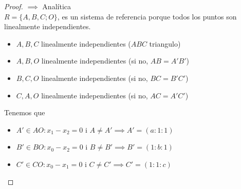 \begin{proof}
$\implies$ Analítica \\
$R = \{A,B,C;O\}$, es un sistema de referencia porque todos los puntos son linealmente independientes.
\begin{itemize}
    \item $A,B,C$ linealmente independientes ($ABC$ triangulo)
    \item $A,B,O$ linealmente independientes (si no, $AB = A'B'$)
    \item $B,C,O$ linealmente independientes (si no, $BC = B'C'$)
    \item $C,A,O$ linealmente independientes (si no, $AC = A'C'$)
\end{itemize}
Tenemos que 
\begin{itemize}
    \item $A' \in AO : x_1 - x_2 = 0$ i $A \neq A' \implies A' = (a:1:1)$
    \item $B' \in BO : x_0 - x_2 = 0$ i $B \neq B' \implies B' = (1:b:1)$
    \item $C' \in CO : x_0 - x_1 = 0$ i $C \neq C' \implies C' = (1:1:c)$
\end{itemize}


\end{proof}
